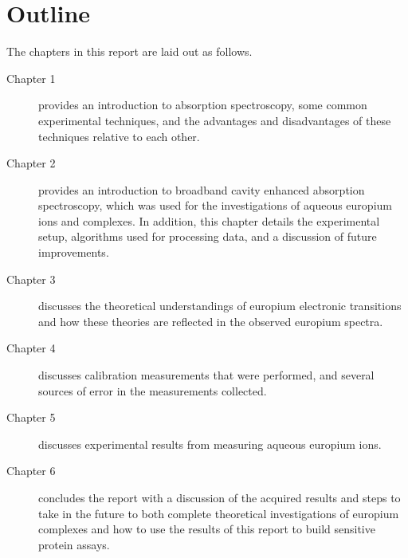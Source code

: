 \section*{Outline}

The chapters in this report are laid out as follows.

\begin{description}
  \item[Chapter 1] provides an introduction to absorption spectroscopy, some
    common experimental techniques, and the advantages and disadvantages of
    these techniques relative to each other.
  \item[Chapter 2] provides an introduction to broadband cavity enhanced
    absorption spectroscopy, which was used for the investigations of aqueous
    europium ions and complexes. In addition, this chapter details the
    experimental setup, algorithms used for processing data, and a discussion
    of future improvements.
  \item[Chapter 3] discusses the theoretical understandings of europium
    electronic transitions and how these theories are reflected in the observed
    europium spectra.
  \item[Chapter 4] discusses calibration measurements that were performed, and
    several sources of error in the measurements collected.
  \item[Chapter 5] discusses experimental results from measuring
    aqueous europium ions.
  \item[Chapter 6] concludes the report with a discussion of the acquired
    results and steps to take in the future to both complete theoretical
    investigations of europium complexes and how to use the results of
    this report to build sensitive protein assays.
\end{description}
